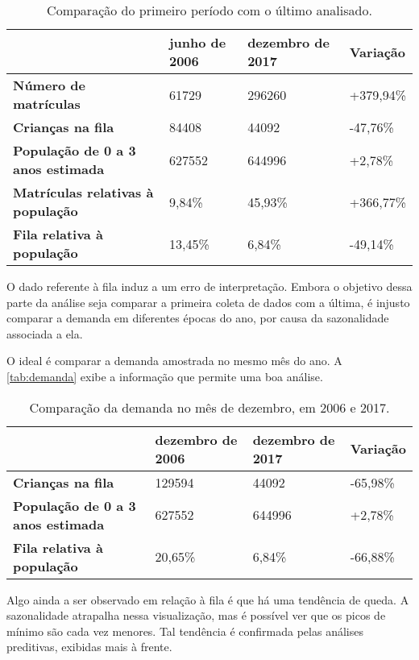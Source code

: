 \begin{table}[H]
	\begin{tabular}{|l|l|l|l|}
		\hline
		\textbf{}                                 & \textbf{junho de 2006} & \textbf{dezembro de 2017} & \textbf{Variação} \\ \hline
		\textbf{Número de matrículas}             & 61729                  & 296260                    & +379,94\%       \\ \hline
		\textbf{Crianças na fila}                 & 84408                  & 44092                     & -47,76\%        \\ \hline
		\textbf{População de 0 a 3 anos estimada} & 627552                 & 644996                    & +2,78\%         \\ \hline
		\textbf{Matrículas relativas à população} & 9,84\%              & 45,93\%               & +366,77\%       \\ \hline
		\textbf{Fila relativa à população}        & 13,45\%             & 6,84\%                 & -49,14\%        \\ \hline
	\end{tabular}
	\caption{Comparação do primeiro período com o último analisado.}
	\label{tab:saopaulo}
\end{table}

O dado referente à fila induz a um erro de interpretação. Embora o objetivo dessa parte da análise seja comparar a primeira coleta de dados com a última, é injusto comparar a demanda em diferentes épocas do ano, por causa da sazonalidade associada a ela.

O ideal é comparar a demanda amostrada no mesmo mês do ano. A \autoref{tab:demanda} exibe a informação que permite uma boa análise.

\begin{table}[H]
	\begin{tabular}{|l|l|l|l|}
		\hline
		\textbf{}                                 & \textbf{dezembro de 2006} & \textbf{dezembro de 2017} & \textbf{Variação} \\ \hline
		\textbf{Crianças na fila}                 & 129594                    & 44092                     & -65,98\%       \\ \hline
		\textbf{População de 0 a 3 anos estimada} & 627552                    & 644996                    & +2,78\%        \\ \hline
		\textbf{Fila relativa à população}        & 20,65\%               & 6,84\%                  & -66,88\%        \\ \hline
	\end{tabular}
	\caption{Comparação da demanda no mês de dezembro, em 2006 e 2017.}
	\label{tab:demanda}
\end{table}

Algo ainda a ser observado em relação à fila é que há uma tendência de queda. A sazonalidade atrapalha nessa visualização, mas é possível ver que os picos de mínimo são cada vez menores. Tal tendência é confirmada pelas análises preditivas, exibidas mais à frente.